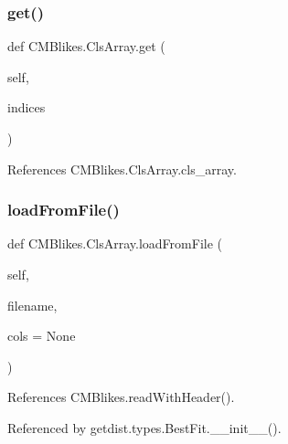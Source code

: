 \subsubsection{\texorpdfstring{get()}{get()}}
{\footnotesize\ttfamily def C\+M\+Blikes.\+Cls\+Array.\+get (\begin{DoxyParamCaption}\item[{}]{self,  }\item[{}]{indices }\end{DoxyParamCaption})}



References C\+M\+Blikes.\+Cls\+Array.\+cls\+\_\+array.

\mbox{\label{classCMBlikes_1_1ClsArray_a8d5595682cfd2e5f4db3d726d50f4505}} 
\subsubsection{\texorpdfstring{load\+From\+File()}{loadFromFile()}}
{\footnotesize\ttfamily def C\+M\+Blikes.\+Cls\+Array.\+load\+From\+File (\begin{DoxyParamCaption}\item[{}]{self,  }\item[{}]{filename,  }\item[{}]{cols = {\ttfamily None} }\end{DoxyParamCaption})}



References C\+M\+Blikes.\+read\+With\+Header().



Referenced by getdist.\+types.\+Best\+Fit.\+\_\+\+\_\+init\+\_\+\+\_\+().


